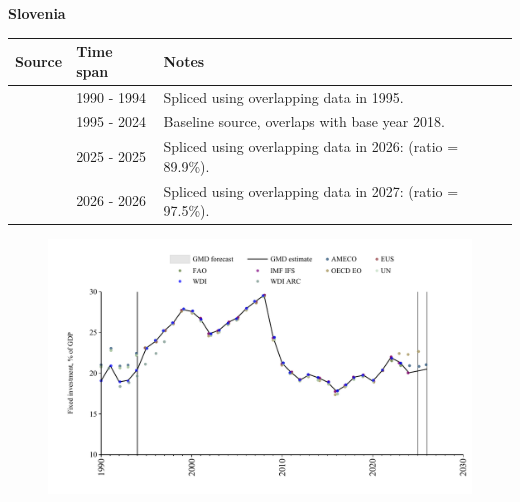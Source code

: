 \documentclass[12pt,a4paper,landscape]{article}
\begin{document}
\begin{adjustbox}{max totalsize={\paperwidth}{\paperheight},center}
\begin{minipage}[t][\textheight][t]{\textwidth}
\vspace*{0.5cm}
{}
\begin{center}
{\Large\bfseries Slovenia}
\end{center}
\vspace{0.5cm}
\begin{table}[H]
\centering
\small
\begin{tabular}{|l|l|l|}
\hline
\textbf{Source} & \textbf{Time span} & \textbf{Notes} \\
\hline
\rowcolor{white}\cite{WDI}& 1990 - 1994 &Spliced using overlapping data in 1995.\\
\rowcolor{lightgray}\cite{EUS}& 1995 - 2024 &Baseline source, overlaps with base year 2018.\\
\rowcolor{white}\cite{OECD_EO}& 2025 - 2025 &Spliced using overlapping data in 2026: (ratio = 89.9\%).\\
\rowcolor{lightgray}\cite{AMECO}& 2026 - 2026 &Spliced using overlapping data in 2027: (ratio = 97.5\%).\\
\hline
\end{tabular}
\end{table}
\begin{figure}[H]
\centering
\includegraphics[width=\textwidth,height=0.6\textheight,keepaspectratio]{graphs/SVN_finv_GDP.pdf}
\end{figure}
\end{minipage}
\end{adjustbox}
\end{document}
